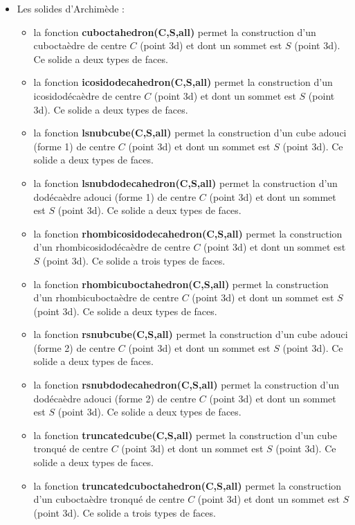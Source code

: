 \begin{itemize}
    \item Les solides d'Archimède :
        \begin{itemize}
            \item la fonction \textbf{cuboctahedron(C,S,all)} permet la construction d'un cuboctaèdre de centre $C$ (point 3d) et dont un sommet est $S$ (point 3d). Ce solide a deux types de faces.
            \item la fonction \textbf{icosidodecahedron(C,S,all)} permet la construction d'un icosidodécaèdre de centre $C$ (point 3d) et dont un sommet est $S$ (point 3d). Ce solide a deux types de faces.
            \item la fonction \textbf{lsnubcube(C,S,all)} permet la construction d'un cube adouci (forme 1) de centre $C$ (point 3d) et dont un sommet est $S$ (point 3d). Ce solide a deux types de faces.
            \item la fonction \textbf{lsnubdodecahedron(C,S,all)} permet la construction d'un dodécaèdre adouci (forme 1) de centre $C$ (point 3d) et dont un sommet est $S$ (point 3d). Ce solide a deux types de faces.
            \item la fonction \textbf{rhombicosidodecahedron(C,S,all)} permet la construction d'un rhombicosidodécaèdre de centre $C$ (point 3d) et dont un sommet est $S$ (point 3d). Ce solide a trois types de faces.
            \item la fonction \textbf{rhombicuboctahedron(C,S,all)} permet la construction d'un rhombicuboctaèdre de centre $C$ (point 3d) et dont un sommet est $S$ (point 3d). Ce solide a deux types de faces.
            \item la fonction \textbf{rsnubcube(C,S,all)} permet la construction d'un cube adouci (forme 2) de centre $C$ (point 3d) et dont un sommet est $S$ (point 3d). Ce solide a deux types de faces.
            \item la fonction \textbf{rsnubdodecahedron(C,S,all)} permet la construction d'un dodécaèdre adouci (forme 2) de centre $C$ (point 3d) et dont un sommet est $S$ (point 3d). Ce solide a deux types de faces.
            \item la fonction \textbf{truncatedcube(C,S,all)} permet la construction d'un cube tronqué de centre $C$ (point 3d) et dont un sommet est $S$ (point 3d). Ce solide a deux types de faces.
            \item la fonction \textbf{truncatedcuboctahedron(C,S,all)} permet la construction d'un cuboctaèdre tronqué de centre $C$ (point 3d) et dont un sommet est $S$ (point 3d). Ce solide a trois types de faces.

\end{itemize}
\end{itemize}
